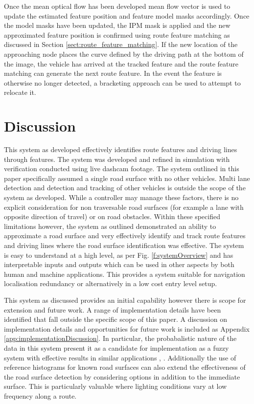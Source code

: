 \documentclass[]{aiaa-tc}%
\begin{document}
Once the mean optical flow has been developed mean flow vector is used to update the estimated feature position and feature model masks accordingly. Once the model masks have been updated, the IPM mask is applied and the new approximated feature position is confirmed using route feature matching as discussed in Section \ref{sect:route_feature_matching}. If the new location of the approaching node places the curve defined by the driving path at the bottom of the image, the vehicle has arrived at the tracked feature and the route feature matching can generate the next route feature. In the event the feature is otherwise no longer detected, a bracketing approach can be used to attempt to relocate it.

\section{Discussion} \label{s:discussion}

This system as developed effectively identifies route features and driving lines through features. The system was developed and refined in simulation with verification conducted using live dashcam footage. The system outlined in this paper specifically assumed a single road surface with no other vehicles. Multi lane detection and detection and tracking of other vehicles is outside the scope of the system as developed. While a controller may manage these factors, there is no explicit consideration for non traversable road surfaces (for example a lane with opposite direction of travel) or on road obstacles. Within these specified limitations however, the system as outlined demonstrated an ability to approximate a road surface and very effectively identify and track route features and driving lines where the road surface identification was effective. The system is easy to understand at a high level, as per Fig. \ref{f:systemOverview} and has interpretable inputs and outputs which can be used in other aspects by both human and machine applications. This provides a system suitable for navigation localisation redundancy or alternatively in a low cost entry level setup.

This system as discussed provides an initial capability however there is scope for extension and future work. A range of implementation details have been identified that fall outside the specific scope of this paper. A discussion on implementation details and opportunities for future work is included as Appendix \ref{app:implementationDiscussion}. In particular, the probabalistic nature of the data in this system present it as a candidate for implementation as a fuzzy system with effective results in similar applications \citep{fuzzySail}, \citep{fuzzyGrove}. Additionally the use of reference histograms for known road surfaces can also extend the effectiveness of the road surface detection by considering options in addition to the immediate surface. This is particularly valuable where lighting conditions vary at low frequency along a route.
\end{document}
